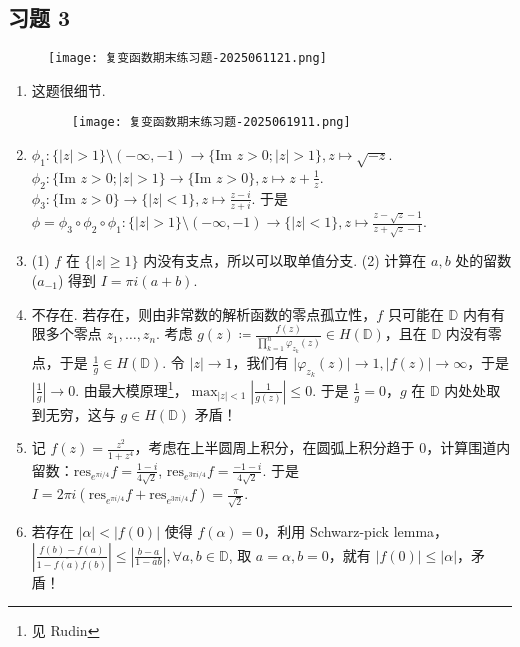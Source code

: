 \subsection{习题 3}

\begin{figure}[H]
\centering
\texttt{[image: 复变函数期末练习题-2025061121.png]}
\label{}
\end{figure}

\begin{enumerate}
	\item 这题很细节.
\begin{figure}[H]
\centering
\texttt{[image: 复变函数期末练习题-2025061911.png]}
\label{}
\end{figure}
	\item $\phi_1:\{ \lvert z \rvert>1 \}\setminus(-\infty,-1)\to \{ \text{Im }z>0;\lvert z \rvert>1 \},z\mapsto \sqrt{ -z }$. $\phi_2:\{ \text{Im }z>0;\lvert z \rvert>1 \}\to \{ \text{Im }z>0 \},z\mapsto z+\frac{1}{z}$. $\phi_3:\{ \text{Im }z>0 \}\to \{ \lvert z \rvert<1 \},z\mapsto\frac{z-i}{z+i}$. 于是 $\phi=\phi_3\circ \phi_2\circ \phi_1:\{ \lvert z \rvert>1 \}\setminus(-\infty,-1)\to \{ \lvert z \rvert<1 \},z\mapsto\frac{z-\sqrt{ z }-1}{z+\sqrt{ z }-1}$.
	\item (1) $f$ 在 $\{ \lvert z \rvert\geq1 \}$ 内没有支点，所以可以取单值分支. (2) 计算在 $a,b$ 处的留数 ($a_{-1}$) 得到 $I=\pi i(a+b)$.
	\item 不存在. 若存在，则由非常数的解析函数的零点孤立性，$f$ 只可能在 $\mathbb{D}$ 内有有限多个零点 $z_1,\dots,z_n$. 考虑 $g (z)\coloneqq\frac{f (z)}{\prod_{k=1}^{n}\varphi_{z_k}(z)}\in H(\mathbb{D})$，且在 $\mathbb{D}$ 内没有零点，于是 $\frac{1}{g}\in H(\mathbb{D})$. 令 $\lvert z \rvert\to1$，我们有 $\lvert \varphi_{z_k}(z) \rvert\to1,\lvert f(z) \rvert\to \infty$，于是 $\left\lvert  \frac{1}{g}  \right\rvert\to0$. 由最大模原理\footnote{见 Rudin}，$\max_{\lvert z \rvert<1}\left\lvert  \frac{1}{g(z)}  \right\rvert\leq0$. 于是 $\frac{1}{g}=0$，$g$ 在 $\mathbb{D}$ 内处处取到无穷，这与 $g\in H(\mathbb{D})$ 矛盾！
	\item 记 $f(z)=\frac{z^{2}}{1+z^{4}}$，考虑在上半圆周上积分，在圆弧上积分趋于 0，计算围道内留数：$\mathrm{res}_{e^{ \pi i/4  }}f=\frac{1-i}{4\sqrt{ 2 }}$, $\mathrm{res}_{e^{ 3\pi i/4  }}f=\frac{-1-i}{4\sqrt{ 2 }}$. 于是 $I=2\pi i(\mathrm{res}_{e^{ \pi i/4  }}f+\mathrm{res}_{e^{ 3\pi i/4  }}f)=\frac{\pi}{\sqrt{ 2 }}$.
	\item 若存在 $\lvert \alpha \rvert<\lvert f(0) \rvert$ 使得 $f(\alpha)=0$，利用 Schwarz-pick lemma，$\left\lvert  \frac{f (b)-f (a)}{1- \overline{f (a)}f (b)}  \right\rvert\leq \left\lvert  \frac{b-a}{1-\overline{a}b}  \right\rvert,\forall a, b\in \mathbb{D}$, 取 $a=\alpha,b=0$，就有 $\lvert f(0) \rvert\leq \lvert \alpha \rvert$，矛盾！

\end{enumerate}

